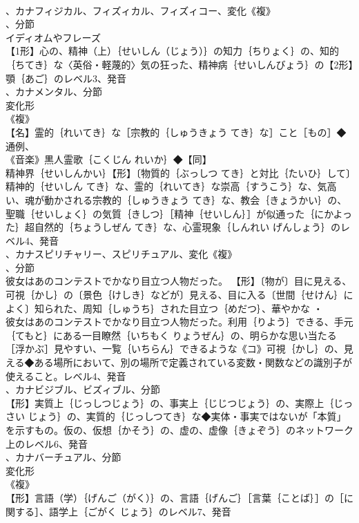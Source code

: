 \documentclass[8pt]{extreport}
\begin{document}
\begin{CJK}{UTF8}{min}
\\	、カナフィジカル、フィズィカル、フィズィコー、変化《複》
\\	、分節
\\	イディオムやフレーズ 
\\	【1形】心の、精神（上）｛せいしん（じょう）｝の知力｛ちりょく｝の、知的｛ちてき｝な〈英俗・軽蔑的〉気の狂った、精神病｛せいしんびょう｝の【2形】顎｛あご｝のレベル3、発音
\\	、カナメンタル、分節
\\	変化形 
\\	《複》
\\	【名】霊的｛れいてき｝な［宗教的｛しゅうきょう てき｝な］こと［もの］◆通例、
\\	《音楽》黒人霊歌｛こくじん れいか｝◆【同】
\\	精神界｛せいしんかい｝【形】〔物質的｛ぶっしつ てき｝と対比｛たいひ｝して〕精神的｛せいしん てき｝な、霊的｛れいてき｝な崇高｛すうこう｝な、気高い、魂が動かされる宗教的｛しゅうきょう てき｝な、教会｛きょうかい｝の、聖職｛せいしょく｝の気質｛きしつ｝［精神｛せいしん｝］が似通った｛にかよった｝超自然的｛ちょうしぜん てき｝な、心霊現象｛しんれい げんしょう｝のレベル4、発音
\\	、カナスピリチャリー、スピリチュアル、変化《複》
\\	、分節
\\	彼女はあのコンテストでかなり目立つ人物だった。		【形】〔物が〕目に見える、可視｛かし｝の〔景色｛けしき｝などが〕見える、目に入る〔世間｛せけん｝によく〕知られた、周知｛しゅうち｝された目立つ｛めだつ｝、華やかな ・
\\	彼女はあのコンテストでかなり目立つ人物だった。利用｛りよう｝できる、手元｛てもと｝にある一目瞭然｛いちもく りょうぜん｝の、明らかな思い当たる［浮かぶ］見やすい、一覧｛いちらん｝できるような《コ》可視｛かし｝の、見える◆ある場所において、別の場所で定義されている変数・関数などの識別子が使えること。レベル4、発音
\\	、カナビジブル、ビズィブル、分節
\\	【形】実質上｛じっしつじょう｝の、事実上｛じじつじょう｝の、実際上｛じっさい じょう｝の、実質的｛じっしつてき｝な◆実体・事実ではないが「本質」を示すもの。仮の、仮想｛かそう｝の、虚の、虚像｛きょぞう｝のネットワーク上のレベル6、発音
\\	、カナバーチュアル、分節
\\	変化形 
\\	《複》
\\	【形】言語（学）｛げんご（がく）｝の、言語｛げんご｝［言葉｛ことば｝］の［に関する］、語学上｛ごがく じょう｝のレベル7、発音

\end{CJK}
\end{document}
